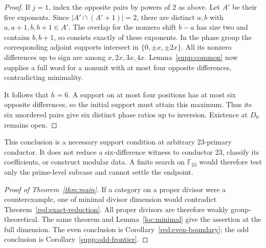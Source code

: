 \documentclass[11pt,a4paper]{article}
\numberwithin{equation}{section}
\begin{document}
\begin{proof}
If $j=1$, index the opposite pairs by powers of $2$ as above.
Let $A'$ be their five exponents. Since $|A'\cap(A'+1)|=2$,
there are distinct $a,b$ with $a,a+1,b,b+1\in A'$.
The overlap for the nonzero shift $b-a$ has size two and contains
$b,b+1$, so consists exactly of these exponents. In the phase group
the corresponding adjoint supports intersect in
$\{0,\pm x,\pm2x\}$. All its nonzero differences up to sign are
among $x,2x,3x,4x$. Lemma~\ref{supp:common} now supplies a full
word for a nonunit with at most four opposite differences,
contradicting minimality.

It follows that $h=6$. A support on at most four positions has at most
six opposite differences, so the initial support must attain this
maximum. Thus its six unordered pairs give six distinct phase ratios
up to inversion. Existence at $D_0$ remains open.
\end{proof}

This conclusion is a necessary support condition at arbitrary
$23$-primary conductor. It does not reduce a six-difference witness
to conductor $23$, classify its coefficients, or construct modular data.
A finite search on $\mathbb F_{23}$ would therefore test only the
prime-level subcase and cannot settle the endpoint.

\begin{proof}[Proof of Theorem~\ref{thm:main}]
If a category on a proper divisor were a counterexample, one of
minimal divisor dimension would contradict
Theorem~\ref{red:exact-reduction}. All proper divisors are therefore
weakly group-theoretical. The same theorem and
Lemma~\ref{loc:minimal} give the assertion at the full dimension.
The even conclusion is Corollary~\ref{red:even-boundary}; the odd
conclusion is Corollary~\ref{supp:odd-frontier}.
\end{proof}
\end{document}
